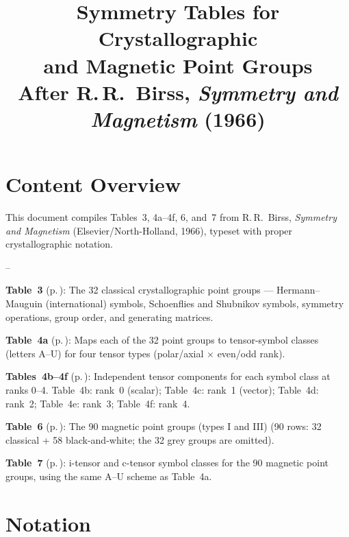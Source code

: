\documentclass[a4paper,11pt]{article}
\title{\textbf{Symmetry Tables for Crystallographic\\and Magnetic Point Groups}\\[6pt]
\large After R.\,R.\ Birss, \textit{Symmetry and Magnetism} (1966)}
\author{}
\date{}
\newenvironment{notelist}{%
  \begin{list}{--}{%
    \setlength{\topsep}{2pt}%
    \setlength{\itemsep}{1pt}%
    \setlength{\parsep}{0pt}%
    \setlength{\leftmargin}{1.5em}%
  }%
}{\end{list}}
\begin{document}
\maketitle
\thispagestyle{empty}
\tableofcontents

\newpage
\section{Content Overview}

This document compiles Tables~3, 4a--4f, 6, and~7 from R.\,R.\ Birss,
\textit{Symmetry and Magnetism} (Elsevier/\allowbreak North-Holland, 1966),
typeset with proper crystallographic notation.

\begin{notelist}
\item \textbf{Table~3} (p.\,\pageref{sec:table3}): The 32 classical crystallographic
  point groups --- Hermann--Mauguin (international) symbols, Schoenflies and Shubnikov
  symbols, symmetry operations, group order, and generating matrices.
\item \textbf{Table~4a} (p.\,\pageref{sec:table4a}): Maps each of the 32 point groups to
  tensor-symbol classes (letters A--U) for four tensor types (polar/axial $\times$
  even/odd rank).
\item \textbf{Tables~4b--4f} (p.\,\pageref{sec:table4bcd}): Independent tensor components
  for each symbol class at ranks 0--4. Table~4b: rank~0 (scalar); Table~4c: rank~1
  (vector); Table~4d: rank~2; Table~4e: rank~3; Table~4f: rank~4.
\item \textbf{Table~6} (p.\,\pageref{sec:table6}): The 90 magnetic point groups (types I and III)
  (90 rows: 32 classical + 58 black-and-white; the 32 grey groups are omitted).
\item \textbf{Table~7} (p.\,\pageref{sec:table7}): i-tensor and c-tensor symbol classes
  for the 90 magnetic point groups, using the same A--U scheme as Table~4a.
\end{notelist}

\section{Notation}
\end{document}

